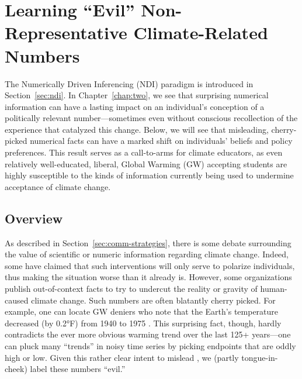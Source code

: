 \graphicspath{{evil-ndi/}}

\chapter{Learning \texorpdfstring{``Evil''}{"Evil"} Non-Representative
    Climate-Related Numbers}
\label{chap:evilndi}

The Numerically Driven Inferencing (NDI) paradigm is introduced in
Section~\ref{sec:ndi}. In Chapter~\ref{chap:two}, we
see that surprising numerical information can have a lasting impact on an
individual's conception of a politically relevant number---sometimes even without
conscious recollection of the experience that catalyzed this change.  Below, we
will see that misleading, cherry-picked numerical facts can have a marked shift
on individuals' beliefs and policy preferences. This result serves as a
call-to-arms for climate educators, as even relatively well-educated, liberal,
Global Warming (GW) accepting students are highly susceptible to the kinds of information
currently being used to undermine acceptance of climate change.

\section{Overview}

As described in Section~\ref{sec:comm-strategies},
there is some debate surrounding the value of scientific or numeric information
regarding climate change. Indeed, some have claimed that such interventions will
only serve to polarize individuals, thus making the situation worse than it
already is. However, some organizations publish out-of-context facts to try to
undercut the reality or gravity of human-caused climate change. Such numbers are
often blatantly cherry picked. For example, one can locate GW deniers who note
that the Earth’s temperature decreased (by 0.2°F) from 1940 to 1975
\parencite{jastrow_global_1991}. This surprising fact, though, hardly
contradicts the ever more obvious warming trend over the last 125+ years---one
can pluck many ``trends'' in noisy time series by picking endpoints that are
oddly high or low. Given this rather clear intent to mislead
\parencite[corroborated by][]{oreskes_merchants_2010}, we (partly
tongue-in-cheek) label these numbers ``evil.'' 


